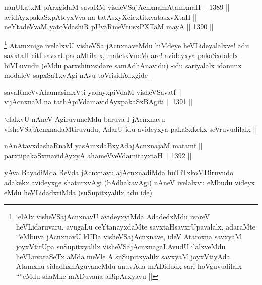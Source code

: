 
\begin{shl}
nanUkatxM pArxgidaM savaRM visheVSajAcnxnamAtamxnaH ||  1389 ||  \\
avidAyxpakaSxpAteyxVva na tatAsxyXcicxtitxvatasxvXtaH ||  \\
neYtadeVvaM yatoV\s dashiR pUvaRmeVtusxPXTaM mayA ||  1390 ||  
\end{shl}

\begin{artha}
\footnote{`elAlx visheVSajAcnxnavU avideyxyiMda AdadedxMdu ivareV heVLidaruvaru. avugaLu ceYtanayxdaMte savxtaHsavxrUpavalalx, adaraMte `\stext'eMbuva jAcnxnavU kUDa visheVSajAcnxnave, ideV Atamxna savxyaM joyxVtirUpa suSupitxyalilx visheVSajAcnxnagaLAvudU ilalxveMdu heVLuvaraSeTx aMda meVle A suSupitxyalilx savxyaM joyxVtiyAda Atamxnu sidadhxnAguvaneMdu anuvAda mADidudx sari hoVguvudilalx ``\stext''eMdu shaMke mADuvana aBipArxyavu ||}
Atamxnige ivelalxvU visheVSa jAcnxnaveMdu hiMdeye heVLideyalalxve! adu savxtaH citf savxrUpadaMtilalx, matetxVneMdare! avideyxya pakaSxdalelx biVLuvudu (eMdu parxshinxsidare samAdhAnavidu) -idu sariyalalx idanunx modaleV sapxSaTxvAgi nAvu toVrisidAdxgide ||
\end{artha}


\begin{shl}
savaRmeVvAhamasimxVti yadayxpiVdaM visheVSavatf || \\
vijAcnxnaM na tathA\s piVdamavidAyxpakaSxBAgiti ||  1391 ||  
\end{shl}

\begin{artha}
`elalxvU nAneV AgiruvuneMdu baruva I jAcnxnavu visheVSajAcnxnadaMtiruvudu, AdarU idu avideyxya pakaSxkekx seVruvudilalx ||
\end{artha}


\begin{shl}
nAnAtavxdashaRnaM yasAmxdaBxyAdajAcnxnajaM matamf || \\
parxtipakaSxmavidAyxyA ahameVveVdamitayxtaH ||  1392 ||  
\end{shl}

\begin{artha}
yAva BayadiMda BeVda jAcnxnavu ajAcnxnadiMda huTiTxkoMDiruvudo adakekx avideyxge shaturxvAgi (bAdhakavAgi) nAneV ivelalxvu eMbudu videyx eMdu heVLidadxriMda (suSupitxyalilx adu ide)
\end{artha}

